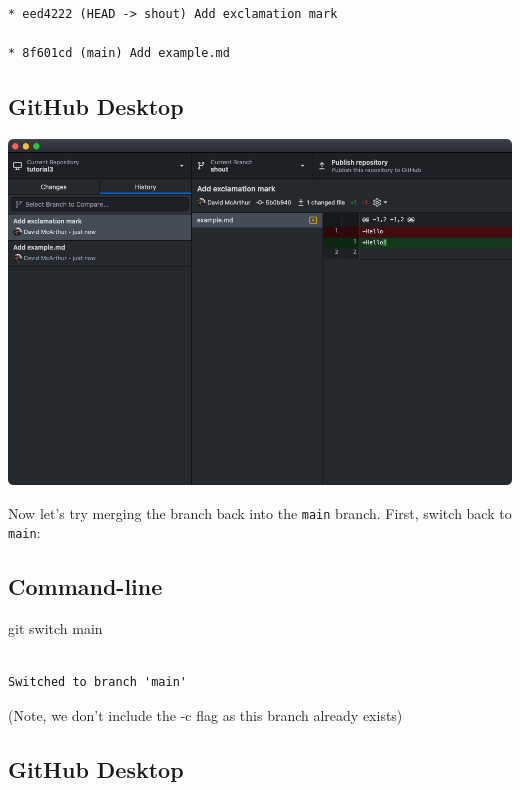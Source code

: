 \documentclass[
  letterpaper,
  DIV=11,
  numbers=noendperiod]{scrartcl}
\newenvironment{Shaded}{\begin{snugshade}}{\end{snugshade}}
\newcommand{\FunctionTok}[1]{\textcolor[rgb]{0.28,0.35,0.67}{#1}}
\newcommand{\NormalTok}[1]{\textcolor[rgb]{0.00,0.23,0.31}{#1}}
\begin{document}
\begin{verbatim}

* eed4222 (HEAD -> shout) Add exclamation mark

* 8f601cd (main) Add example.md
\end{verbatim}

\subsection{GitHub Desktop}

\includegraphics{images/image31.png}

Now let's try merging the branch back into the \texttt{main} branch.
First, switch back to \texttt{main}:

\subsection{Command-line}

\begin{Shaded}
\begin{Highlighting}[]
\FunctionTok{git}\NormalTok{ switch main}
\end{Highlighting}
\end{Shaded}

\begin{verbatim}

Switched to branch 'main'
\end{verbatim}

(Note, we don't include the -c flag as this branch already exists)

\subsection{GitHub Desktop}
\end{document}
